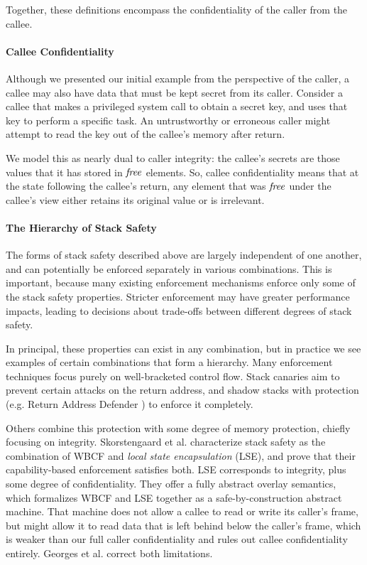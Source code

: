 \documentclass[10pt,conference]{ieeetran}%
\theoremstyle{definition}
\begin{document}
Together, these definitions encompass the confidentiality of the caller from the callee.

\paragraph*{Callee Confidentiality}

Although we presented our initial example from the perspective of the caller, a callee
may also have data that must be kept secret from its caller. Consider a callee that makes
a privileged system call to obtain a secret key, and uses that key to perform a specific
task. An untrustworthy or erroneous caller might attempt to read the key out of the callee's
memory after return.

We model this as nearly dual to caller integrity: the callee's secrets are those
values that it has stored in \(\mathit{free}\) elements. So, callee confidentiality means that
at the state following the callee's return, any element that was \(\mathit{free}\) under the
callee's view either retains its original value or is irrelevant.

\paragraph*{The Hierarchy of Stack Safety}

The forms of stack safety described above are largely independent of one another, and
can potentially be enforced separately in various combinations. This is important, because
many existing enforcement mechanisms enforce only some of the stack safety
properties. Stricter enforcement may have greater performance impacts, leading to decisions
about trade-offs between different degrees of stack safety.

In principal, these properties can exist in any combination, but in practice we see examples
of certain combinations that form a hierarchy. Many enforcement techniques focus purely on
well-bracketed control flow. Stack canaries aim to prevent certain attacks on the return
address, and shadow stacks with protection (e.g. Return Address Defender \cite{Chiueh2001RAD})
to enforce it completely.

Others combine this protection with some degree of memory protection,
chiefly focusing on integrity. Skorstengaard et al. \cite{SkorstengaardSTK} characterize stack
safety as the combination of WBCF and {\it local state encapsulation} (LSE), and prove that their
capability-based enforcement satisfies both. LSE corresponds to integrity, plus some degree of
confidentiality.  They offer a fully abstract overlay semantics, which formalizes WBCF and LSE
together as a safe-by-construction abstract machine. That machine does not allow a callee to
read or write its caller's frame, but might allow it to read data that is left behind below
the caller's frame, which is weaker than our full caller confidentiality and rules out
callee confidentiality entirely. Georges et al. \cite{Georges22:TempsDesCerises} correct
both limitations.
\end{document}
